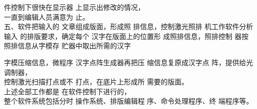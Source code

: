 \documentclass[linespread=1]{ctexart}
\begin{document}
\begin{minipage}[t]{10\ccwd}
件控制下很快在显示器
上显示出修改的情况，\\
一直到编辑人员满意为
止。\\
\hspace*{2\ccwd}%
{\heiti 五、软件把输入的
文章组成版面，形成照
排信息，控制激光照排
机工作}\hspace{\ccwd}软件分析输入
的排版要求，确定每个
汉字在版面上的位置形
成照排信息，照排控制
器按照排信息从字模存
贮器中取出所需的汉字
\end{minipage}%
\hspace{\ccwd}%
\begin{minipage}[t]{10\ccwd}
字模压缩信息，微程序
汉字点阵生成器再把压
缩信息复原成汉字点
阵，提供给光调制器，\\ 
控制激光扫描打点或不
打点，在底片上形成所
需要的版面。\\
\hspace*{2\ccwd}%
上述全部工作都是
在软件控制下进行的，\\
整个软件系统包括分时
操作系统、排版编辑程
序、命令处理程序、终
端程序等。
\end{minipage}
\end{document}
